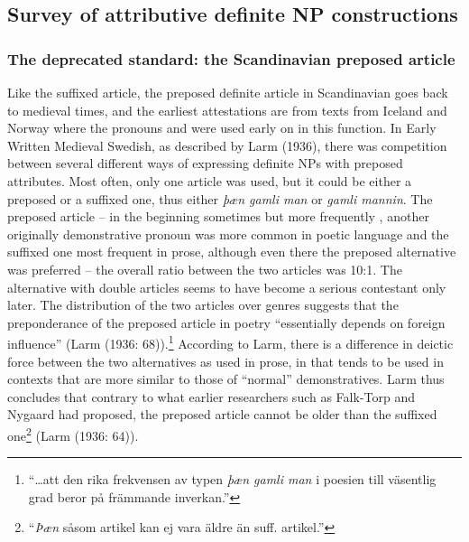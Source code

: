 \subsection[Survey of attributive definite NP constructions]{\rmfamily Survey of attributive definite NP constructions}
\label{bkm:Ref224464037}\subsubsection[The deprecated standard: the Scandinavian preposed article]{\rmfamily The deprecated standard: the Scandinavian preposed article}
\label{bkm:Ref154983973}\label{bkm:Ref154988501}%
Like the suffixed article, the preposed definite article in Scandinavian goes back to medieval times, and the earliest attestations are from texts from Iceland and Norway where the pronouns and were used early on in this function. In Early Written Medieval Swedish, as described by Larm (1936), there was competition between several different ways of expressing definite NPs with preposed attributes. Most often, only one article was used, but it could be either a preposed or a suffixed one, thus either \textit{þæn gamli man} or \textit{gamli mannin}. The preposed article – in the beginning sometimes  but more frequently , another originally demonstrative pronoun was more common in poetic language and the suffixed one most frequent in prose, although even there the preposed alternative was preferred – the overall ratio between the two articles was 10:1. The alternative with double articles seems to have become a serious contestant only later. The distribution of the two articles over genres suggests that the preponderance of the preposed article in poetry “essentially depends on foreign influence” (Larm (1936: 68)).\footnote{ “…att den rika frekvensen av typen \textit{þæn gamli man} i poesien till väsentlig grad beror på främmande inverkan.”} According to Larm, there is a difference in deictic force between the two alternatives as used in prose, in that  tends to be used in contexts that are more similar to those of “normal” demonstratives. Larm thus concludes that contrary to what earlier researchers such as Falk-Torp and Nygaard had proposed, the preposed article  cannot be older than the suffixed one\footnote{ “\textit{Þæn }såsom artikel kan ej vara äldre än suff. artikel.” } (Larm (1936: 64)).

